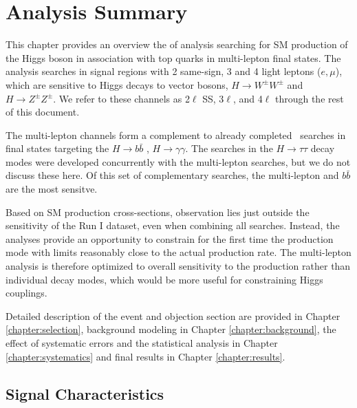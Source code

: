 \chapter[Analysis Summary][Analysis Summary]{Analysis Summary}
\label{chapter:analysis} 

This chapter provides an overview the of analysis searching for SM
production of the Higgs boson in association with top quarks in
multi-lepton final states. The analysis searches in signal regions
with 2 same-sign, 3 and 4 light leptons ($e, \mu$), which are sensitive to Higgs
decays to vector bosons, $H\rightarrow W^{\pm}W^{\pm}$ and $H\rightarrow
Z^{\pm}Z^{\pm}$. We refer to these channels
as 2$\ell$ SS, 3$\ell$, and 4$\ell$ through the rest
of this document. 

The multi-lepton channels form a complement to already completed \tth\ searches in
final states targeting the $H\rightarrow b\bar{b}$ \cite{Aad:2014lma},
$H\rightarrow\gamma\gamma$\cite{ATLAS-CONF-2014-011}. The \tth searches
in the $H\rightarrow\tau\tau$ decay modes were developed concurrently with the
multi-lepton searches, but we do not discuss these here.  
Of this set of complementary searches, the multi-lepton and $b\bar{b}$ are the most sensitve. 

Based on SM production cross-sections, observation lies just outside the sensitivity
of the Run I dataset, even when combining all searches. Instead, the analyses provide an opportunity to 
constrain for the first time the \tth production mode with limits reasonably close to the
actual production rate. The multi-lepton analysis is therefore optimized to overall sensitivity to the 
\tth production rather than individual decay modes, which would be more useful for
constraining Higgs couplings. 

Detailed description of the event and objection section are provided in Chapter \ref{chapter:selection},
background modeling in Chapter \ref{chapter:background}, the effect of systematic errors and the 
statistical analysis in Chapter \ref{chapter:systematics} and final results in Chapter \ref{chapter:results}.


\section{Signal Characteristics} 

